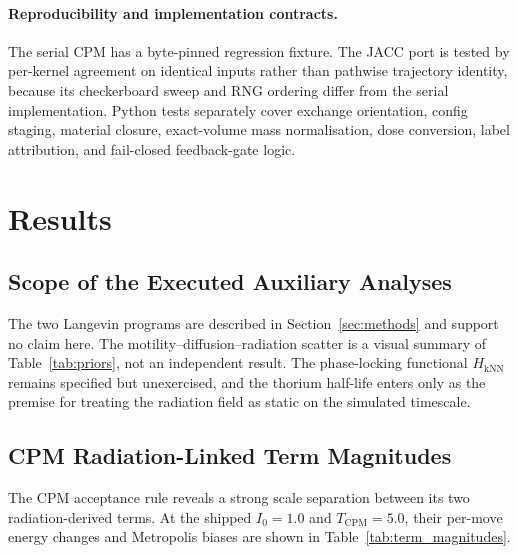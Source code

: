 \documentclass[11pt]{article}
\begin{document}
\paragraph{Reproducibility and implementation contracts.}
The serial CPM has a byte-pinned regression fixture. The JACC port is tested by per-kernel agreement
on identical inputs rather than pathwise trajectory identity, because its checkerboard sweep and RNG
ordering differ from the serial implementation. Python tests separately cover exchange orientation,
config staging, material closure, exact-volume mass normalisation, dose conversion, label
attribution, and fail-closed feedback-gate logic.

\section{Results}
\label{sec:results}

\subsection{Scope of the Executed Auxiliary Analyses}

The two Langevin programs are described in Section~\ref{sec:methods} and support no claim here.
The motility--diffusion--radiation scatter is a visual summary of
Table~\ref{tab:priors}, not an independent result. The phase-locking functional
$H_{\mathrm{kNN}}$ remains specified but unexercised, and the thorium half-life enters only as the
premise for treating the radiation field as static on the simulated timescale.

\subsection{CPM Radiation-Linked Term Magnitudes}
\label{sec:cpm_term_magnitudes}

The CPM acceptance rule reveals a strong scale separation between its two radiation-derived terms.
At the shipped $I_0=1.0$ and $T_{\mathrm{CPM}}=5.0$, their per-move energy changes and Metropolis
biases are shown in Table~\ref{tab:term_magnitudes}.
\end{document}

